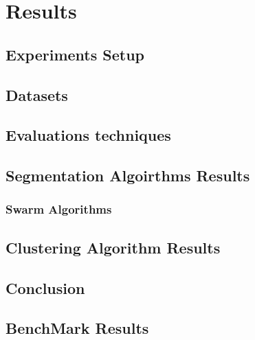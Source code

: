\chapter{Results}

\section{Experiments Setup}
\label{sec:ExperimentsSetup}
\section{Datasets}
\label{sec:Datasets}
\section{Evaluations techniques}
\label{sec:EvaluationsTechniques}

\section{Segmentation Algoirthms Results}
\label{sec:SegmentationAlgoirthmsResults}


\subsection{Swarm Algorithms}
\label{sec:Swarm Algorithms}

\section{Clustering Algorithm Results}
\label{sec:ClusteringAlgorithmResults}

\section{Conclusion}
\label{sec:Conclusion}

\section{ BenchMark Results }
\label{sec:BenchMarkResults}


